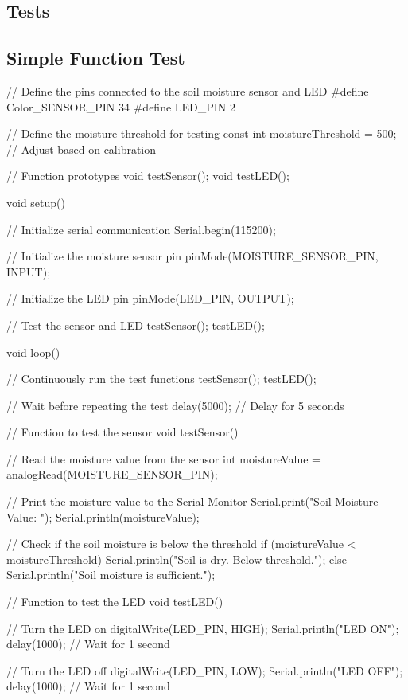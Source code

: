 \subsection{Tests}

\subsection{Simple Function Test}

\begin{Arduino}
	// Define the pins connected to the soil moisture sensor and LED
	#define Color_SENSOR_PIN 34
	#define LED_PIN 2
	
	// Define the moisture threshold for testing
	const int moistureThreshold = 500; // Adjust based on calibration
	
	// Function prototypes
	void testSensor();
	void testLED();
	
	void setup() {
		// Initialize serial communication
		Serial.begin(115200);
		
		// Initialize the moisture sensor pin
		pinMode(MOISTURE_SENSOR_PIN, INPUT);
		
		// Initialize the LED pin
		pinMode(LED_PIN, OUTPUT);
		
		// Test the sensor and LED
		testSensor();
		testLED();
	}
	
	void loop() {
		// Continuously run the test functions
		testSensor();
		testLED();
		
		// Wait before repeating the test
		delay(5000); // Delay for 5 seconds
	}
	
	// Function to test the sensor
	void testSensor() {
		// Read the moisture value from the sensor
		int moistureValue = analogRead(MOISTURE_SENSOR_PIN);
		
		// Print the moisture value to the Serial Monitor
		Serial.print("Soil Moisture Value: ");
		Serial.println(moistureValue);
		
		// Check if the soil moisture is below the threshold
		if (moistureValue < moistureThreshold) {
			Serial.println("Soil is dry. Below threshold.");
		} else {
			Serial.println("Soil moisture is sufficient.");
		}
	}
	
	// Function to test the LED
	void testLED() {
		// Turn the LED on
		digitalWrite(LED_PIN, HIGH);
		Serial.println("LED ON");
		delay(1000); // Wait for 1 second
		
		// Turn the LED off
		digitalWrite(LED_PIN, LOW);
		Serial.println("LED OFF");
		delay(1000); // Wait for 1 second
	}
	
\end{Arduino}


